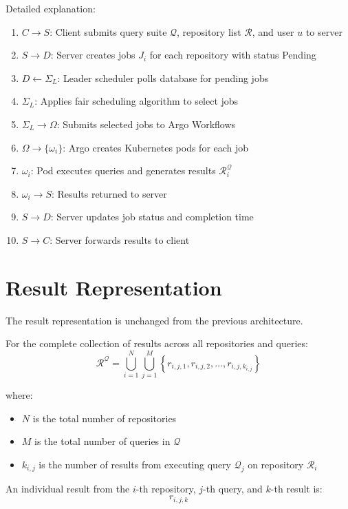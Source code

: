 \documentclass[11pt]{article}
\begin{document}
Detailed explanation:
\begin{enumerate}
\item $C \to S$: Client submits query suite $\mathcal{Q}$, repository list $\mathcal{R}$, and user $u$ to server
\item $S \to D$: Server creates jobs $J_i$ for each repository with status Pending
\item $D \leftarrow \Sigma_L$: Leader scheduler polls database for pending jobs
\item $\Sigma_L$: Applies fair scheduling algorithm to select jobs
\item $\Sigma_L \to \Omega$: Submits selected jobs to Argo Workflows
\item $\Omega \to \{\omega_i\}$: Argo creates Kubernetes pods for each job
\item $\omega_i$: Pod executes queries and generates results $\mathcal{R}_i^{\mathcal{Q}}$
\item $\omega_i \to S$: Results returned to server
\item $S \to D$: Server updates job status and completion time
\item $S \to C$: Server forwards results to client
\end{enumerate}

\section{Result Representation}

The result representation is unchanged from the previous architecture.

For the complete collection of results across all repositories and queries:
\begin{equation}
  \mathcal{R}^{\mathcal{Q}} = \bigcup_{i=1}^{N} \bigcup_{j=1}^{M}
  \left\{ r_{i,j,1}, r_{i,j,2}, \dots, r_{i,j,k_{i,j}} \right\}
\end{equation}

where:
\begin{itemize}
\item $N$ is the total number of repositories
\item $M$ is the total number of queries in $\mathcal{Q}$
\item $k_{i,j}$ is the number of results from executing query $\mathcal{Q}_j$ on repository $\mathcal{R}_i$
\end{itemize}

An individual result from the $i$-th repository, $j$-th query, and $k$-th result is:
\begin{equation}
  r_{i,j,k}
\end{equation}
\end{document}
